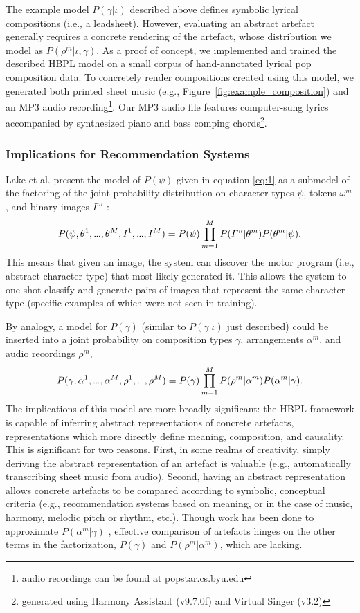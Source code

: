 \documentclass[phd,electronic,oneside,twosidetoc,letterpaper,chaptercenter,parttop,lof,lot]{byumsphd}
\newcommand\mydots{\hbox to .75em{.\hss.\hss.}}
\begin{document}
The example model $P(\gamma|\iota)$ described above defines symbolic lyrical compositions (i.e., a leadsheet). However, evaluating an abstract artefact generally requires a concrete rendering of the artefact, whose distribution we model as $P(\rho^{m}|\iota,\gamma)$. As a proof of concept, we implemented and trained the described HBPL model on a small corpus of hand-annotated lyrical pop composition data. To concretely render compositions created using this model, we generated both printed sheet music (e.g., Figure~\ref{fig:example_composition}) and an MP3 audio recording\footnote{audio recordings can be found at \url{popstar.cs.byu.edu}}. Our MP3 audio file features computer-sung lyrics accompanied by synthesized piano and bass comping chords\footnote{generated using Harmony Assistant (v9.7.0f) and Virtual Singer (v3.2)}.

\subsubsection{Implications for Recommendation Systems}

Lake et al. present the model of $P(\psi)$ given in equation \ref{eq:1} as a submodel of the factoring of the joint probability distribution on character types $\psi$, tokens $\omega^m$, and binary images $I^m$ \cite{Lake2015}:
\small
\[ P(\psi, \theta^1, \mydots,\theta^M,I^1,\mydots,I^M) = P(\psi) \prod_{m=1}^{M} P(I^m|\theta^m)P(\theta^m|\psi). \]
\normalsize
This means that given an image, the system can discover the motor program (i.e., abstract character type) that most likely generated it. This allows the system to one-shot classify and generate pairs of images that represent the same character type (specific examples of which were not seen in training). 

By analogy, a model for $P(\gamma)$ (similar to $P(\gamma|\iota)$ just described) could be inserted into a joint probability on composition types $\gamma$, arrangements $\alpha^m$, and audio recordings $\rho^m$,
\small
\[ P(\gamma,\alpha^1,\mydots,\alpha^M,\rho^1,\mydots, \rho^M) = P(\gamma) \prod_{m=1}^M P(\rho^m|\alpha^m)P(\alpha^m|\gamma). \]
\normalsize
The implications of this model are more broadly significant: the HBPL framework is capable of inferring abstract representations of concrete artefacts, representations which more directly define meaning, composition, and causality. This is significant for two reasons. First, in some realms of creativity, simply deriving the abstract representation of an artefact is valuable (e.g., automatically transcribing sheet music from audio). Second, having an abstract representation allows concrete artefacts to be compared according to symbolic, conceptual criteria (e.g., recommendation systems based on meaning, or in the case of music, harmony, melodic pitch or rhythm, etc.). Though work has been done to approximate $P(\alpha^m|\gamma)$ \cite{benetos2013automatic}, effective comparison of artefacts hinges on the other terms in the factorization, $P(\gamma)$ and $P(\rho^m|\alpha^m)$, which are lacking.
\end{document}
